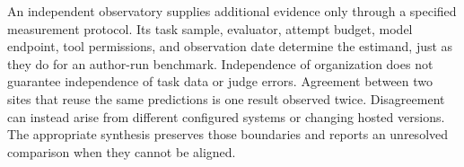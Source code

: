 An independent observatory supplies additional evidence only through a specified measurement protocol. Its task sample, evaluator, attempt budget, model endpoint, tool permissions, and observation date determine the estimand, just as they do for an author-run benchmark. Independence of organization does not guarantee independence of task data or judge errors. Agreement between two sites that reuse the same predictions is one result observed twice. Disagreement can instead arise from different configured systems or changing hosted versions. The appropriate synthesis preserves those boundaries and reports an unresolved comparison when they cannot be aligned.


